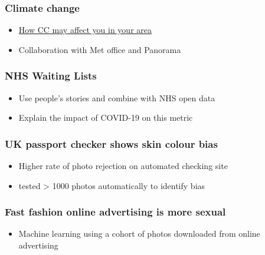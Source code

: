 \documentclass[
  letterpaper,
  DIV=11,
  numbers=noendperiod]{scrartcl}
\providecommand{\tightlist}{%
  \setlength{\itemsep}{0pt}\setlength{\parskip}{0pt}}
\begin{document}
\hypertarget{climate-change}{%
\subsubsection{Climate change}\label{climate-change}}

\begin{itemize}
\tightlist
\item
  \href{https://www.bbc.co.uk/news/resources/idt-d6338d9f-8789-4bc2-b6d7-3691c0e7d138}{How
  CC may affect you in your area}
\item
  Collaboration with Met office and Panorama
\end{itemize}

\hypertarget{nhs-waiting-lists}{%
\subsubsection{NHS Waiting Lists}\label{nhs-waiting-lists}}

\begin{itemize}
\tightlist
\item
  Use people's stories and combine with NHS open data
\item
  Explain the impact of COVID-19 on this metric
\end{itemize}

\hypertarget{uk-passport-checker-shows-skin-colour-bias}{%
\subsubsection{UK passport checker shows skin colour
bias}\label{uk-passport-checker-shows-skin-colour-bias}}

\begin{itemize}
\tightlist
\item
  Higher rate of photo rejection on automated checking site
\item
  tested \textgreater{} 1000 photos automatically to identify bias
\end{itemize}

\hypertarget{fast-fashion-online-advertising-is-more-sexual}{%
\subsubsection{Fast fashion online advertising is more
sexual}\label{fast-fashion-online-advertising-is-more-sexual}}

\begin{itemize}
\tightlist
\item
  Machine learning using a cohort of photos downloaded from online
  advertising
\end{itemize}
\end{document}
